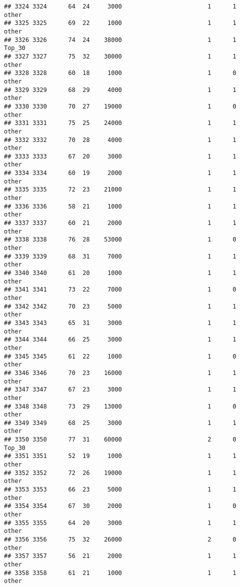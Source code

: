 \documentclass[
]{article}
\begin{document}
\begin{verbatim}
## 3324 3324      64  24     3000                        1      1    other
## 3325 3325      69  22     1000                        1      1    other
## 3326 3326      74  24    38000                        1      1   Top_30
## 3327 3327      75  32    30000                        1      1    other
## 3328 3328      60  18     1000                        1      0    other
## 3329 3329      68  29     4000                        1      1    other
## 3330 3330      70  27    19000                        1      0    other
## 3331 3331      75  25    24000                        1      1    other
## 3332 3332      70  28     4000                        1      1    other
## 3333 3333      67  20     3000                        1      1    other
## 3334 3334      60  19     2000                        1      1    other
## 3335 3335      72  23    21000                        1      1    other
## 3336 3336      58  21     1000                        1      1    other
## 3337 3337      60  21     2000                        1      1    other
## 3338 3338      76  28    53000                        1      0    other
## 3339 3339      68  31     7000                        1      1    other
## 3340 3340      61  20     1000                        1      1    other
## 3341 3341      73  22     7000                        1      0    other
## 3342 3342      70  23     5000                        1      1    other
## 3343 3343      65  31     3000                        1      1    other
## 3344 3344      66  25     3000                        1      1    other
## 3345 3345      61  22     1000                        1      0    other
## 3346 3346      70  23    16000                        1      1    other
## 3347 3347      67  23     3000                        1      1    other
## 3348 3348      73  29    13000                        1      0    other
## 3349 3349      68  25     3000                        1      1    other
## 3350 3350      77  31    60000                        2      0   Top_30
## 3351 3351      52  19     1000                        1      1    other
## 3352 3352      72  26    19000                        1      1    other
## 3353 3353      66  23     5000                        1      1    other
## 3354 3354      67  30     2000                        1      0    other
## 3355 3355      64  20     3000                        1      1    other
## 3356 3356      75  32    26000                        2      0    other
## 3357 3357      56  21     2000                        1      1    other
## 3358 3358      61  21     1000                        1      1    other

\end{verbatim}
\end{document}
